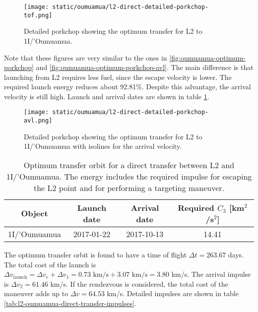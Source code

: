 \begin{figure}[H]
  \centering
  \texttt{[image: static/oumuamua/l2-direct-detailed-porkchop-tof.png]}
        \caption[Detailed porkchop showing the optimum transfer for
        L2 to 1I/'Oumuamua with the time of flight.]{Detailed porkchop showing the optimum transfer for
        L2 to 1I/'Oumuamua. 
  }
  \label{fig:l2-oumuamua-optimum-porkchop}
\end{figure}

Note that these figures are very similar to the ones in
\ref{fig:oumuamua-optimum-porkchop} and \ref{fig:oumuamua-optimum-porkchop-avl}.
The main difference is that launching from L2 requires less fuel, since the
escape velocity is lower. The required launch energy reduces about 92.81\%.
Despite this advantage, the arrival velocity is still high. Launch and arrival
dates are shown in table \ref{tab:l2-oumuamua-direct-transfer-optimum}.

\begin{figure}[H]
  \centering
  \texttt{[image: static/oumuamua/l2-direct-detailed-porkchop-avl.png]}
        \caption[Detailed porkchop showing the optimum transfer for
        L2 to 1I/'Oumuamua with the arrival velocity.]{Detailed porkchop showing the
        optimum transfer for L2 to 1I/'Oumuamua with isolines for the arrival
        velocity.}
  \label{fig:l2-oumuamua-optimum-porkchop-avl}
\end{figure}

\vspace{1cm}
\begin{table}[H]
  \centering
  \begin{tabular}{|c|c|c|c|}
    \hline
    Object & Launch date & Arrival date & Required $C_3$ [km$^2$/s$^2$] \\
    \hline
    1I/'Oumuamua & 2017-01-22 & 2017-10-13 & 14.41 \\
    \hline
  \end{tabular}
  \caption[Optimum transfer orbit for a direct transfer between L2 and
        1I/'Oumuamua.]{Optimum transfer orbit for a direct transfer between
        L2 and 1I/'Oumuamua. The energy includes the required impulse for
        escaping the L2 point and for performing a targeting maneuver.}
  \label{tab:l2-oumuamua-direct-transfer-optimum}
\end{table}

The optimum transfer orbit is found to have a time of flight $\Delta t = 263.67$
days. The total cost of the launch is $\Delta v_\text{launch} = \Delta v_e +
\Delta v_1 = 0.73 \text{ km/s} + 3.07 \text{ km/s} = 3.80$ km/s. The arrival
impulse is $\Delta v_2 = 61.46$ km/s. If the rendezvous is considered, the total
cost of the maneuver adds up to $\Delta v = 64.53$ km/s. Detailed impulses are
shown in table \ref{tab:l2-oumuamua-direct-transfer-impulses}.

